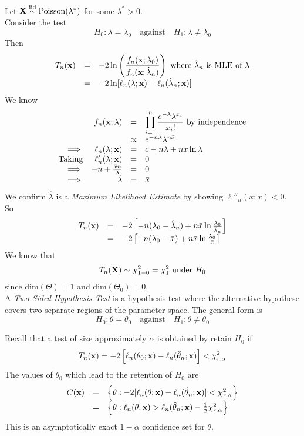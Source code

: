 \documentclass[11pt,a4paper]{article}
\begin{document}
\example{}
Let $\textbf{X}\overset{\text{iid}}{\sim}\text{Poisson}(\lambda^*)$ for some $\lambda^*>0$.\\
Consider the test
$$H_0:\lambda=\lambda_0\quad\text{against}\quad H_1:\lambda\neq\lambda_0$$
Then
\[\begin{array}{rcl}
T_n(\textbf{x})&=&-2\ln\left(\dfrac{f_n(\textbf{x};\lambda_0)}{f_n(\textbf{x};\hat\lambda_n)}\right)\text{ where }\hat\lambda_n\text{ is MLE of }\lambda\\
&=&-2\ln[\ell_n(\lambda;\textbf{x})-\ell_n(\hat\lambda_n;\textbf{x})]
\end{array}\]
We know
\[\begin{array}{rrcl}
&f_n(\textbf{x};\lambda)&=&{\displaystyle\prod_{i=1}^n\dfrac{e^{-\lambda}\lambda^{x_i}}{x_i!}}\text{ by independence}\\
&&\propto&e^{-n\lambda}\lambda^{n\bar{x}}\\
\implies&\ell_n(\lambda;\textbf{x})&=&c-n\lambda+n\bar{x}\ln\lambda\\
\text{Taking}&\ell'_n(\lambda;\textbf{x})&=&0\\
\implies&-n+\frac{\bar{x}n}{\lambda}&=&0\\
\implies&\hat\lambda&=&\bar{x}
\end{array}\]
We confirm $\hat\lambda$ is a \textit{Maximum Likelihood Estimate} by showing $\ell''_n(\bar{x};x)<0$.\\
So
\[\begin{array}{rcl}
T_n(\textbf{x})&=&-2\left[-n(\lambda_0-\hat\lambda_n)+n\bar{x}\ln\frac{\lambda_0}{\hat\lambda_n}\right]\\
&=&-2\left[-n(\lambda_0-\bar{x})+n\bar{x}\ln\frac{\lambda_0}{\bar{x}}\right]
\end{array}\]
We know that
$$T_n(\textbf{X})\sim\chi^2_{1-0}=\chi^2_1\text{ under }H_0$$
since $\text{dim}(\Theta)=1$ and $\text{dim}(\Theta_0)=0$.\\

A \textit{Two Sided Hypothesis Test} is a hypothesis test where the alternative hypothese covers two separate regions of the parameter space. The general form is
$$H_0:\theta=\theta_0\quad\text{against}\quad H_1:\theta\neq\theta_0$$

Recall that a test of size approximately $\alpha$ is obtained by retain $H_0$ if
$$T_n(\textbf{x})=-2\left[\ell_n(\theta_0;\textbf{x})-\ell_n(\hat\theta_n;\textbf{x})\right]<\chi^2_{r,\alpha}$$
The values of $\theta_0$ which lead to the retention of $H_0$ are
\[\begin{array}{rcl}
C(\textbf{x})&=&\left\{\theta:-2[\ell_n(\theta;\textbf{x})-\ell_n(\hat\theta_n;\textbf{x})]<\chi^2_{r,\alpha}\right\}\\
&=&\left\{\theta:\ell_n(\theta;\textbf{x})>\ell_n(\hat\theta_n;\textbf{x})-\frac{1}{2}\chi^2_{r,\alpha}\right\}\\
\end{array}\]
This is an asymptotically exact $1-\alpha$ confidence set for $\theta$.
\end{document}

